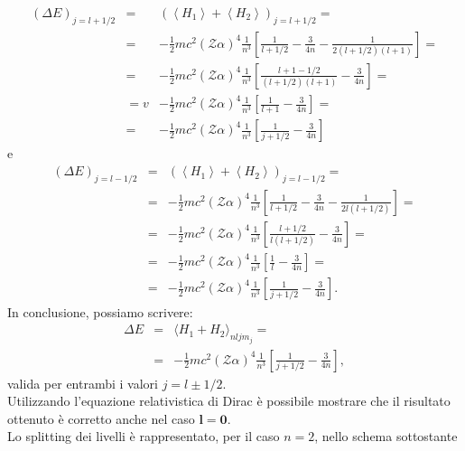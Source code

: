 \documentclass[a4paper,12pt,oneside]{book}
\begin{document}
\begin{eqnarray} 
\left( \Delta E \right)_{j=l+1/2} &= & \left( \left< H_1\right> +\left<H_2 \right>  \right)_{j=l+1/2}= \nonumber \\
& =& -\frac{1}{2} mc^2 \left( \mathcal{Z}\alpha \right)^4 \frac{1}{n^3} \left[ \frac{1}{l+1/2}-\frac{3}{4n}-\frac{1}{2(l+1/2)(l+1)}\right]=  \nonumber \\
& = & -\frac{1}{2} mc^2 \left( \mathcal{Z}\alpha \right)^4 \frac{1}{n^3} \left[ \frac{l+1-1/2}{(l+1/2)(l+1)}-\frac{3}{4n}\right]= \nonumber  \\
& =v& -\frac{1}{2} mc^2 \left( \mathcal{Z}\alpha \right)^4 \frac{1}{n^3} \left[ \frac{1}{l+1}-\frac{3}{4n} \right]= \nonumber \\
& = &-\frac{1}{2} mc^2 \left( \mathcal{Z}\alpha \right)^4 \frac{1}{n^3} \left[ \frac{1}{j+1/2}-\frac{3}{4n} \right]
\end{eqnarray}
e
\begin{eqnarray} 
 \left( \Delta E \right)_{j=l-1/2}&=&\left( \left< H_1\right> +\left<H_2 \right>  \right)_{j=l-1/2}= \nonumber \\
& = &-\frac{1}{2} mc^2 \left( \mathcal{Z}\alpha \right)^4 \frac{1}{n^3} \left[ \frac{1}{l+1/2}-\frac{3}{4n}-\frac{1}{2l(l+1/2)}\right]= \nonumber \\
& =& -\frac{1}{2} mc^2 \left( \mathcal{Z}\alpha \right)^4 \frac{1}{n^3} \left[ \frac{l+1/2}{l(l+1/2)}-\frac{3}{4n}\right]= \nonumber \\
& = &-\frac{1}{2} mc^2 \left( \mathcal{Z}\alpha \right)^4 \frac{1}{n^3} \left[ \frac{1}{l}-\frac{3}{4n} \right]= \nonumber  \\
& = & -\frac{1}{2} mc^2 \left( \mathcal{Z}\alpha \right)^4 \frac{1}{n^3} \left[ \frac{1}{j+1/2}-\frac{3}{4n} \right] .
\end{eqnarray}
In conclusione, possiamo scrivere:
\begin{eqnarray}
\Delta E &=& \langle H_1+H_2 \rangle_{nljm_j}= \nonumber\\
& = &-\frac{1}{2}mc^2 \left( \mathcal{Z}\alpha \right)^4 \frac{1}{n^3} \left[ \frac{1}{j+1/2}-\frac{3}{4n}\right] ,
\end{eqnarray}
valida per entrambi i valori $j=l\pm1/2$. \\
Utilizzando l'equazione relativistica di Dirac è possibile mostrare che il risultato ottenuto è corretto anche nel caso \textbf{$\boldsymbol{l=0}$}. \\
Lo splitting dei livelli è rappresentato, per il caso $n=2$, nello schema sottostante\\
\end{document}
